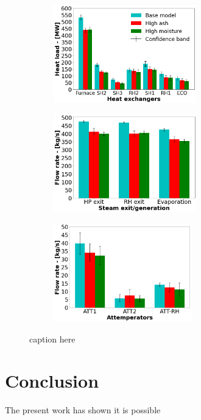 \documentclass[a4paper,fleqn]{cas-dc}
\begin{document}
\begin{figure}
\centering
\begin{subfigure}{0.33\textwidth}
    \includegraphics[width=\textwidth, height = 4.25cm]{100_FUEL_CASE}
    \caption{}
\end{subfigure}\hfill %
\begin{subfigure}{0.33\textwidth}
    \includegraphics[width=\linewidth, height = 4.25cm]{100_FUEL_CASE_STEAM}
    \caption{}
\end{subfigure}\hfill
\begin{subfigure}{0.33\textwidth}
    \includegraphics[width=\linewidth, height = 4.25cm]{100_FUEL_CASE_ATTEMP}
    \caption{}
\end{subfigure}
\caption{caption here}
\label{fig_fuel_results}
\end{figure}

\section{Conclusion}

The present work has shown it is possible
\newpage
\printcredits


%



\bio{}
\endbio

\end{document}
